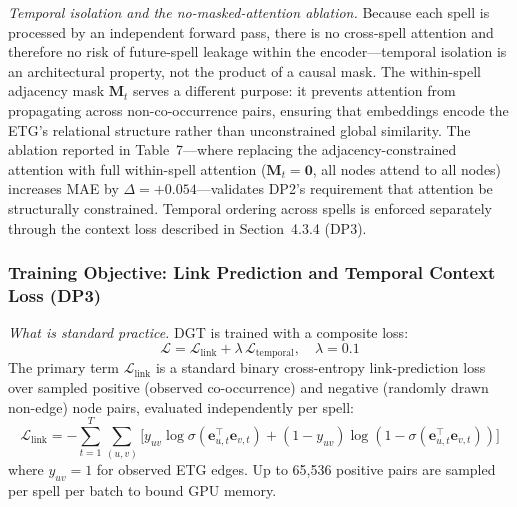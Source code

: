 \documentclass[12pt]{article}
\begin{document}
\textit{Temporal isolation and the no-masked-attention ablation.} Because each spell is processed by an independent forward pass, there is no cross-spell attention and therefore no risk of future-spell leakage within the encoder---temporal isolation is an architectural property, not the product of a causal mask. The within-spell adjacency mask $\mathbf{M}_t$ serves a different purpose: it prevents attention from propagating across non-co-occurrence pairs, ensuring that embeddings encode the ETG's relational structure rather than unconstrained global similarity. The ablation reported in Table~7---where replacing the adjacency-constrained attention with full within-spell attention ($\mathbf{M}_t = \mathbf{0}$, all nodes attend to all nodes) increases MAE by $\Delta = +0.054$---validates DP2's requirement that attention be structurally constrained. Temporal ordering across spells is enforced separately through the context loss described in Section~4.3.4 (DP3).

\subsubsection{Training Objective: Link Prediction and Temporal Context Loss (DP3)}

\textit{What is standard practice.} DGT is trained with a composite loss:
\begin{equation}
  \mathcal{L} = \mathcal{L}_{\text{link}} + \lambda\, \mathcal{L}_{\text{temporal}}, \quad \lambda = 0.1
\end{equation}
The primary term $\mathcal{L}_{\text{link}}$ is a standard binary cross-entropy link-prediction loss over sampled positive (observed co-occurrence) and negative (randomly drawn non-edge) node pairs, evaluated independently per spell:
\begin{equation}
  \mathcal{L}_{\text{link}} = -\!\sum_{t=1}^{T}\!\sum_{(u,v)}\!\Big[ y_{uv}\log\sigma(\mathbf{e}_{u,t}^{\top}\mathbf{e}_{v,t}) + (1-y_{uv})\log(1-\sigma(\mathbf{e}_{u,t}^{\top}\mathbf{e}_{v,t}))\Big]
\end{equation}
where $y_{uv}=1$ for observed ETG edges. Up to 65,536 positive pairs are sampled per spell per batch to bound GPU memory.
\end{document}
